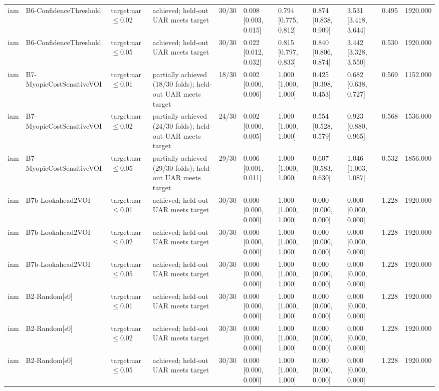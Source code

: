 \begin{table}[!ht]
{\begin{tabular}{lllllllllll}
iam & B6-ConfidenceThreshold & target:uar$\le$0.02 & achieved; held-out UAR meets target & 30/30 & 0.008 [0.003, 0.015] & 0.794 [0.775, 0.812] & 0.874 [0.838, 0.909] & 3.531 [3.418, 3.644] & 0.495 & 1920.000 \\
iam & B6-ConfidenceThreshold & target:uar$\le$0.05 & achieved; held-out UAR meets target & 30/30 & 0.022 [0.012, 0.032] & 0.815 [0.797, 0.833] & 0.840 [0.806, 0.874] & 3.442 [3.328, 3.550] & 0.530 & 1920.000 \\
iam & B7-MyopicCostSensitiveVOI & target:uar$\le$0.01 & partially achieved (18/30 folds); held-out UAR meets target & 18/30 & 0.002 [0.000, 0.006] & 1.000 [1.000, 1.000] & 0.425 [0.398, 0.453] & 0.682 [0.638, 0.727] & 0.569 & 1152.000 \\
iam & B7-MyopicCostSensitiveVOI & target:uar$\le$0.02 & partially achieved (24/30 folds); held-out UAR meets target & 24/30 & 0.002 [0.000, 0.005] & 1.000 [1.000, 1.000] & 0.554 [0.528, 0.579] & 0.923 [0.880, 0.965] & 0.568 & 1536.000 \\
iam & B7-MyopicCostSensitiveVOI & target:uar$\le$0.05 & partially achieved (29/30 folds); held-out UAR meets target & 29/30 & 0.006 [0.001, 0.011] & 1.000 [1.000, 1.000] & 0.607 [0.583, 0.630] & 1.046 [1.003, 1.087] & 0.532 & 1856.000 \\
iam & B7b-Lookahead2VOI & target:uar$\le$0.01 & achieved; held-out UAR meets target & 30/30 & 0.000 [0.000, 0.000] & 1.000 [1.000, 1.000] & 0.000 [0.000, 0.000] & 0.000 [0.000, 0.000] & 1.228 & 1920.000 \\
iam & B7b-Lookahead2VOI & target:uar$\le$0.02 & achieved; held-out UAR meets target & 30/30 & 0.000 [0.000, 0.000] & 1.000 [1.000, 1.000] & 0.000 [0.000, 0.000] & 0.000 [0.000, 0.000] & 1.228 & 1920.000 \\
iam & B7b-Lookahead2VOI & target:uar$\le$0.05 & achieved; held-out UAR meets target & 30/30 & 0.000 [0.000, 0.000] & 1.000 [1.000, 1.000] & 0.000 [0.000, 0.000] & 0.000 [0.000, 0.000] & 1.228 & 1920.000 \\
iam & B2-Random[s0] & target:uar$\le$0.01 & achieved; held-out UAR meets target & 30/30 & 0.000 [0.000, 0.000] & 1.000 [1.000, 1.000] & 0.000 [0.000, 0.000] & 0.000 [0.000, 0.000] & 1.228 & 1920.000 \\
iam & B2-Random[s0] & target:uar$\le$0.02 & achieved; held-out UAR meets target & 30/30 & 0.000 [0.000, 0.000] & 1.000 [1.000, 1.000] & 0.000 [0.000, 0.000] & 0.000 [0.000, 0.000] & 1.228 & 1920.000 \\
iam & B2-Random[s0] & target:uar$\le$0.05 & achieved; held-out UAR meets target & 30/30 & 0.000 [0.000, 0.000] & 1.000 [1.000, 1.000] & 0.000 [0.000, 0.000] & 0.000 [0.000, 0.000] & 1.228 & 1920.000 \\

\end{tabular}}
\end{table}
